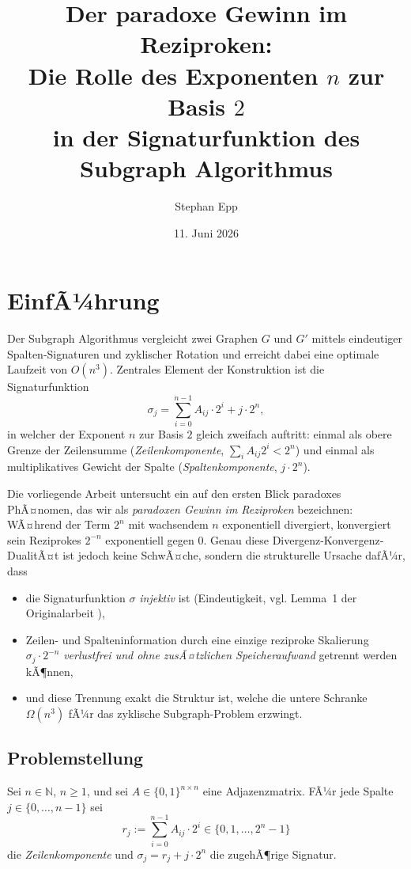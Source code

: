 ﻿\documentclass[a4paper,12pt]{article}
\title{Der paradoxe Gewinn im Reziproken:\\
Die Rolle des Exponenten $n$ zur Basis $2$\\
in der Signaturfunktion des Subgraph Algorithmus}
\author{Stephan Epp}
\date{11. Juni 2026}
\theoremstyle{definition}
\begin{document}
\maketitle

\tableofcontents
\newpage

\section{EinfÃ¼hrung}

Der Subgraph Algorithmus vergleicht zwei Graphen $G$ und $G'$ mittels eindeutiger
Spalten-Signaturen und zyklischer Rotation und erreicht dabei eine optimale
Laufzeit von $O(n^3)$. Zentrales Element der Konstruktion ist die Signaturfunktion
\[
	\sigma_j = \sum_{i=0}^{n-1} A_{ij} \cdot 2^i + j \cdot 2^n,
\]
in welcher der Exponent $n$ zur Basis $2$ gleich zweifach auftritt: einmal als
obere Grenze der Zeilensumme (\emph{Zeilenkomponente}, $\sum_i A_{ij}2^i < 2^n$)
und einmal als multiplikatives Gewicht der Spalte (\emph{Spaltenkomponente},
$j \cdot 2^n$).

Die vorliegende Arbeit untersucht ein auf den ersten Blick paradoxes PhÃ¤nomen,
das wir als \emph{paradoxen Gewinn im Reziproken} bezeichnen: WÃ¤hrend der
Term $2^n$ mit wachsendem $n$ exponentiell divergiert, konvergiert sein
Reziprokes $2^{-n}$ exponentiell gegen $0$. Genau diese Divergenz-Konvergenz-DualitÃ¤t
ist jedoch keine SchwÃ¤che, sondern die strukturelle Ursache dafÃ¼r, dass
\begin{itemize}
	\item die Signaturfunktion $\sigma$ \emph{injektiv} ist (Eindeutigkeit, vgl.
	      Lemma~1 der Originalarbeit \cite{epp2026subgraph}),
	\item Zeilen- und Spalteninformation durch eine einzige reziproke Skalierung
	      $\sigma_j \cdot 2^{-n}$ \emph{verlustfrei und ohne zusÃ¤tzlichen Speicheraufwand}
	      getrennt werden kÃ¶nnen,
	\item und diese Trennung exakt die Struktur ist, welche die untere
	      Schranke $\Omega(n^3)$ fÃ¼r das zyklische Subgraph-Problem erzwingt.
\end{itemize}

\subsection{Problemstellung}

Sei $n \in \mathbb{N}$, $n \geq 1$, und sei $A \in \{0,1\}^{n \times n}$ eine
Adjazenzmatrix. FÃ¼r jede Spalte $j \in \{0,\ldots,n-1\}$ sei
\[
	r_j := \sum_{i=0}^{n-1} A_{ij} \cdot 2^i \in \{0, 1, \ldots, 2^n - 1\}
\]
die \emph{Zeilenkomponente} und $\sigma_j = r_j + j \cdot 2^n$ die zugehÃ¶rige
Signatur.
\end{document}
